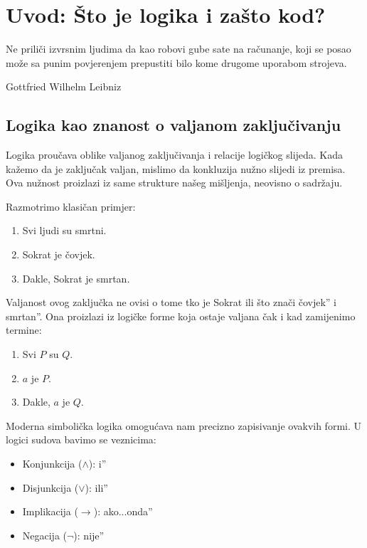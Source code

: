 \chapter{Uvod: Što je logika i zašto kod?}


\epigraph{Ne priliči izvrsnim ljudima da kao robovi gube sate na računanje, koji se posao može sa punim povjerenjem prepustiti bilo kome drugome uporabom strojeva.}{Gottfried Wilhelm Leibniz\footnotemark}


\section{Logika kao znanost o valjanom zaključivanju}


Logika proučava oblike valjanog zaključivanja i relacije logičkog slijeda. Kada kažemo da je zaključak valjan, mislimo da konkluzija nužno slijedi iz premisa. Ova nužnost proizlazi iz same strukture našeg mišljenja, neovisno o sadržaju.


Razmotrimo klasičan primjer:
\begin{enumerate}
\item Svi ljudi su smrtni.
\item Sokrat je čovjek.
\item Dakle, Sokrat je smrtan.
\end{enumerate}


Valjanost ovog zaključka ne ovisi o tome tko je Sokrat ili što znači čovjek'' i smrtan''. Ona proizlazi iz logičke forme koja ostaje valjana čak i kad zamijenimo termine:
\begin{enumerate}
\item Svi $P$ su $Q$.
\item $a$ je $P$.
\item Dakle, $a$ je $Q$.
\end{enumerate}


Moderna simbolička logika omogućava nam precizno zapisivanje ovakvih formi. U logici sudova bavimo se veznicima:
\begin{itemize}
\item Konjunkcija ($\wedge$): i'' \item Disjunkcija ($\vee$): ili''

\item Implikacija ($\rightarrow$): ako...onda'' \item Negacija ($\neg$): nije''
\end{itemize}


